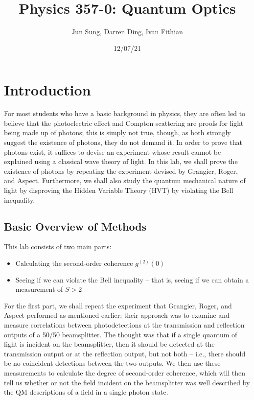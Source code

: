 \documentclass[twocolumn,amsmath,amssymb,pra]{revtex4-2}
\begin{document}
\title{Physics 357-0: Quantum Optics}

\author{Jun Sung, Darren Ding, Ivan Fithian}

\date{12/07/21}

\maketitle

\section{Introduction}
For most students who have a basic background in physics, they are often led to believe that the photoelectric effect and Compton scattering are proofs for light being made up of photons; this is simply not true, though, as both strongly suggest the existence of photons, they do not demand it. In order to prove that photons exist, it suffices to devise an experiment whose result cannot be explained using a classical wave theory of light. In this lab, we shall prove the existence of photons by repeating the experiment devised by Grangier, Roger, and Aspect. Furthermore, we shall also study the quantum mechanical nature of light by disproving the Hidden Variable Theory (HVT) by violating the Bell inequality.

\subsection{Basic Overview of Methods}
This lab consists of two main parts: 
\begin{itemize}
    \item Calculating the second-order coherence $g^{(2)}(0)$
    \item Seeing if we can violate the Bell inequality -- that is, seeing if we can obtain a measurement of $S > 2$
\end{itemize}
For the first part, we shall repeat the experiment that Grangier, Roger, and Aspect performed as mentioned earlier; their approach was to examine and measure correlations between photodetections at the transmission and reflection outputs of a 50/50 beamsplitter. The thought was that if a single quantum of light is incident on the beamsplitter, then it should be detected at the transmission output or at the reflection output, but not both -- i.e., there should be no coincident detections between the two outputs. We then use these measurements to calculate the degree of second-order coherence, which will then tell us whether or not the field incident on the beamsplitter was well described by the QM descriptions of a field in a single photon state.
\end{document}
